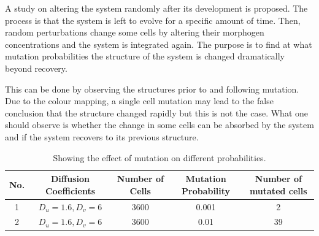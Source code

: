 A study on altering the system randomly after its development is proposed. The process is that the system is left to evolve for a specific amount of time. Then, random perturbations change some cells by altering their morphogen concentrations and the system is integrated again. The purpose is to find at what mutation probabilities the structure of the system is changed dramatically beyond recovery.

This can be done by observing the structures prior to and following mutation. Due to the colour mapping, a single cell mutation may lead to the false conclusion that the structure changed rapidly but this is not the case. What one should observe is whether the change in some cells can be absorbed by the system and if the system recovers to its previous structure.

\begin{table}
\begin{center}
\caption{Showing the effect of mutation on different probabilities.}
\label{muttable}
\begin{tabular}{| c | c | c | c | c |}
\hline
No. & Diffusion Coefficients & Number of Cells & Mutation Probability & Number of mutated cells \\ \hline
1 & $ D_u=1.6, D_v=6 $ & 3600 & 0.001 & 2 \\ \hline
2 & $ D_u=1.6, D_v=6 $ & 3600 & 0.01 & 39 \\ \hline
\end{tabular}
\end{center}
\end{table}

